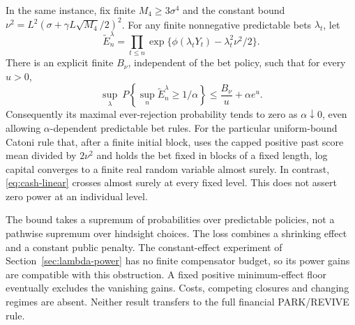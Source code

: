 \begin{proposition}
\label{prop:vanishing-uniform}
In the same instance, fix finite $M_4\ge3\sigma^4$ and the constant bound
$\nu^2=L^2(\sigma+\gamma L\sqrt{M_4}/2)^2$. For any finite nonnegative
predictable bets $\lambda_t$, let
\[
 \widetilde E_n^{\lambda}
 =\prod_{t\le n}\exp\{\phi(\lambda_tY_t)-\lambda_t^2\nu^2/2\}.
\]
There is an explicit finite $B_\nu$, independent of the bet policy, such that
for every $u>0$,
\begin{equation}
 \sup_{\lambda}\ P\!\left\{\sup_n\widetilde E_n^{\lambda}\ge1/\alpha\right\}
 \le \frac{B_\nu}{u}+\alpha e^u.
 \label{eq:uniform-family-power}
\end{equation}
Consequently its maximal ever-rejection probability tends to zero as
$\alpha\downarrow0$, even allowing $\alpha$-dependent predictable bet rules.
For the particular uniform-bound Catoni rule that, after a finite initial
block, uses the capped positive past score mean divided by $2\nu^2$ and holds
the bet fixed in blocks of a fixed length, log capital converges to a finite
real random variable almost surely. In contrast, \eqref{eq:cash-linear}
crosses almost surely at every fixed level. This does not assert zero power
at an individual level.
\end{proposition}

The bound takes a supremum of probabilities over predictable policies, not a
pathwise supremum over hindsight choices. The loss combines a shrinking effect
and a constant public penalty. The constant-effect experiment of
Section~\ref{sec:lambda-power} has no finite compensator budget, so its power
gains are compatible with this obstruction. A fixed positive minimum-effect
floor eventually excludes the vanishing gains. Costs, competing closures and
changing regimes are absent. Neither result transfers to the full financial
PARK/REVIVE rule.

